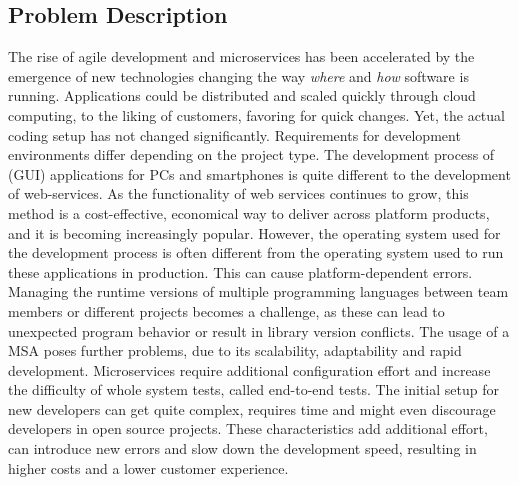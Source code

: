     \subsection{Problem Description}
    The rise of agile development and microservices has been accelerated by the emergence of new technologies changing the way \textit{where} and \textit{how} software is running. Applications could be distributed and scaled quickly through cloud computing, to the liking of customers, favoring for quick changes. Yet, the actual coding setup has not changed significantly.\newline
    Requirements for development environments differ depending on the project type. The development process of (\ac{GUI}) applications for PCs and smartphones is quite different to the development of web-services. As the functionality of web services continues to grow, this method is a cost-effective, economical way to deliver across platform products, and it is becoming increasingly popular. However, the operating system used for the development process is often different from the operating system used to run these applications in production. This can cause platform-dependent errors. Managing the runtime versions of multiple programming languages between team members or different projects becomes a challenge, as these can lead to unexpected program behavior or result in library version conflicts. The usage of a \acl{MSA} poses further problems, due to its scalability, adaptability and rapid development. Microservices require additional configuration effort and increase the difficulty of whole system tests, called end-to-end tests. The initial setup for new developers can get quite complex, requires time and might even discourage developers in open source projects.\newline
    These characteristics add additional effort, can introduce new errors and slow down the development speed, resulting in higher costs and a lower customer experience.

